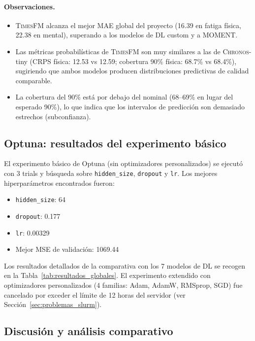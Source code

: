 \documentclass[12pt, a4paper]{article}
\newcommand{\code}[1]{\texttt{#1}}
\newcommand{\chronos}{\textsc{Chronos}}
\newcommand{\timesfm}{\textsc{TimesFM}}
\begin{document}
\paragraph{Observaciones.}
\begin{itemize}
    \item \timesfm{} alcanza el mejor MAE global del proyecto (16.39 en fatiga física, 22.38 en mental), superando a los modelos de DL custom y a MOMENT.
    \item Las métricas probabilísticas de \timesfm{} son muy similares a las de \chronos{}-tiny (CRPS física: 12.53 vs 12.59; cobertura 90\% física: 68.7\% vs 68.4\%), sugiriendo que ambos modelos producen distribuciones predictivas de calidad comparable.
    \item La cobertura del 90\% está por debajo del nominal (68--69\% en lugar del esperado 90\%), lo que indica que los intervalos de predicción son demasiado estrechos (subconfianza).
\end{itemize}


\subsection{Optuna: resultados del experimento básico}

El experimento básico de Optuna (sin optimizadores personalizados) se ejecutó con 3 trials y búsqueda sobre \code{hidden\_size}, \code{dropout} y \code{lr}. Los mejores hiperparámetros encontrados fueron:

\begin{itemize}
    \item \code{hidden\_size}: 64
    \item \code{dropout}: 0.177
    \item \code{lr}: 0.00329
    \item Mejor MSE de validación: 1069.44
\end{itemize}

Los resultados detallados de la comparativa con los 7 modelos de DL se recogen en la Tabla~\ref{tab:resultados_globales}. El experimento extendido con optimizadores personalizados (4 familias: Adam, AdamW, RMSprop, SGD) fue cancelado por exceder el límite de 12 horas del servidor (ver Sección~\ref{sec:problemas_slurm}).


\subsection{Discusión y análisis comparativo}
\end{document}
